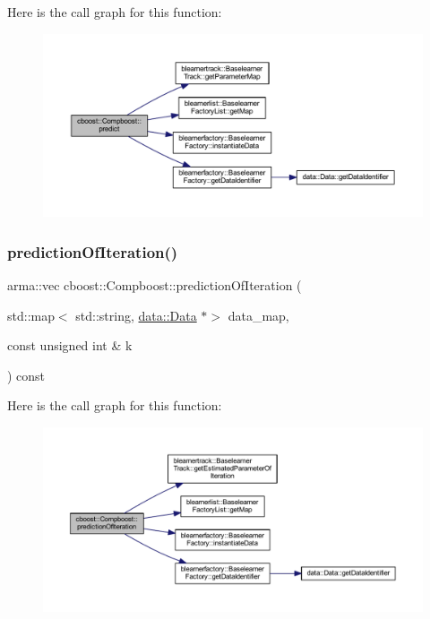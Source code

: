 Here is the call graph for this function\+:\nopagebreak
\begin{figure}[H]
\begin{center}
\leavevmode
\includegraphics[width=350pt]{classcboost_1_1_compboost_a1779a0c89cf9da32b250c0c083631c58_cgraph}
\end{center}
\end{figure}
\mbox{\label{classcboost_1_1_compboost_a6582a12bf1060750367219aeae395963}} 
\subsubsection{\texorpdfstring{prediction\+Of\+Iteration()}{predictionOfIteration()}}
{\footnotesize\ttfamily arma\+::vec cboost\+::\+Compboost\+::prediction\+Of\+Iteration (\begin{DoxyParamCaption}\item[{std\+::map$<$ std\+::string, \mbox{\hyperlink{classdata_1_1_data}{data\+::\+Data}} $\ast$$>$}]{data\+\_\+map,  }\item[{const unsigned int \&}]{k }\end{DoxyParamCaption}) const}

Here is the call graph for this function\+:\nopagebreak
\begin{figure}[H]
\begin{center}
\leavevmode
\includegraphics[width=350pt]{classcboost_1_1_compboost_a6582a12bf1060750367219aeae395963_cgraph}
\end{center}
\end{figure}
\mbox{\label{classcboost_1_1_compboost_ad1ee3b88f585f38255d827dceb4b7659}} 
